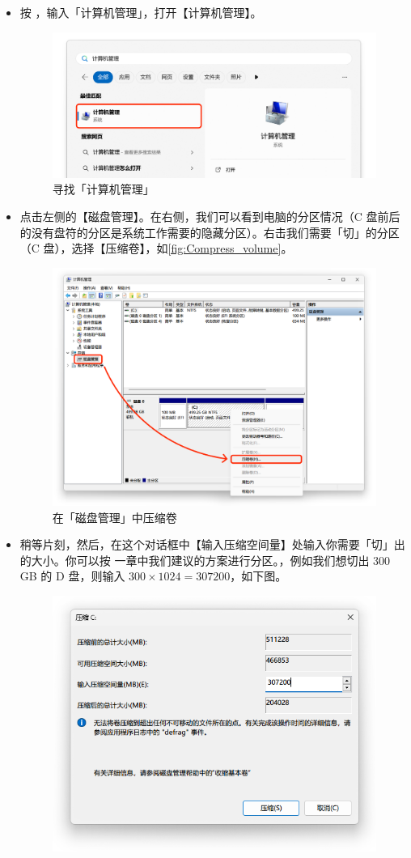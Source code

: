 \begin{itemize}
  \item 按 ，输入「计算机管理」，打开【计算机管理】。
    \begin{figure}[htb!]
      \centering
      \includegraphics[width=.8\textwidth]{assets/appendix/Computer_management.png}
      \caption{寻找「计算机管理」}
      \label{fig:Computer_management}
    \end{figure}
  \item 点击左侧的【磁盘管理】。在右侧，我们可以看到电脑的分区情况（C 盘前后的没有盘符的分区是系统工作需要的隐藏分区）。右击我们需要「切」的分区（C 盘），选择【压缩卷】，如\autoref{fig:Compress_volume}。
    \begin{figure}[htb!]
      \centering
      \includegraphics[width=.65\textwidth]{assets/appendix/Compress_volume.png}
      \caption{在「磁盘管理」中压缩卷}
      \label{fig:Compress_volume}
    \end{figure}
  \item 稍等片刻，然后，在这个对话框中【输入压缩空间量】处输入你需要「切」出的大小。你可以按 一章中我们建议的方案进行分区。，例如我们想切出 300 GB 的 D 盘，则输入 $300\times1024=307200$，如下图。
    \begin{figure}[htb!]
      \centering
      \includegraphics[width=.5\textwidth]{assets/appendix/Setting_size.png}

\end{figure}
\end{itemize}
